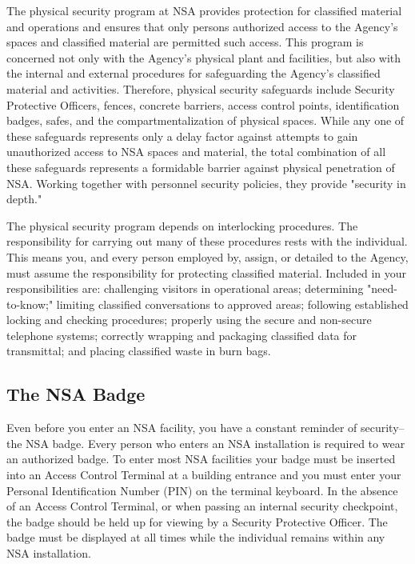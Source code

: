 \documentclass[a4]{article}
\begin{document}
The physical security program at NSA provides protection for classified
material and operations and ensures that only persons authorized access to the
Agency's spaces and classified material are permitted such access.  This
program is concerned not only with the Agency's physical plant and facilities,
but also with the internal and external procedures for safeguarding the
Agency's classified material and activities.  Therefore, physical security
safeguards include Security Protective Officers, fences, concrete barriers,
access control points, identification badges, safes, and the
compartmentalization of physical spaces.  While any one of these safeguards
represents only a delay factor against attempts to gain unauthorized access to
NSA spaces and material, the total combination of all these safeguards
represents a formidable barrier against physical penetration of NSA.  Working
together with personnel security policies, they provide "security in depth."

The physical security program depends on interlocking procedures.  The
responsibility for carrying out many of these procedures rests with the
individual.  This means you, and every person employed by, assign, or detailed
to the Agency, must assume the responsibility for protecting classified
material.  Included in your responsibilities are:  challenging visitors in
operational areas; determining "need-to-know;" limiting classified
conversations to approved areas; following established locking and checking
procedures; properly using the secure and non-secure telephone systems;
correctly wrapping and packaging classified data for transmittal; and placing
classified waste in burn bags.

\subsection{The NSA Badge}

Even before you enter an NSA facility, you have a constant reminder of
security--the NSA badge.  Every person who enters an NSA installation is
required to wear an authorized badge.  To enter most NSA facilities your badge
must be inserted into an Access Control Terminal at a building entrance and you
must enter your Personal Identification Number (PIN) on the terminal keyboard.
In the absence of an Access Control Terminal, or when passing an internal
security checkpoint, the badge should be held up for viewing by a Security
Protective Officer.  The badge must be displayed at all times while the
individual remains within any NSA installation.
\end{document}
